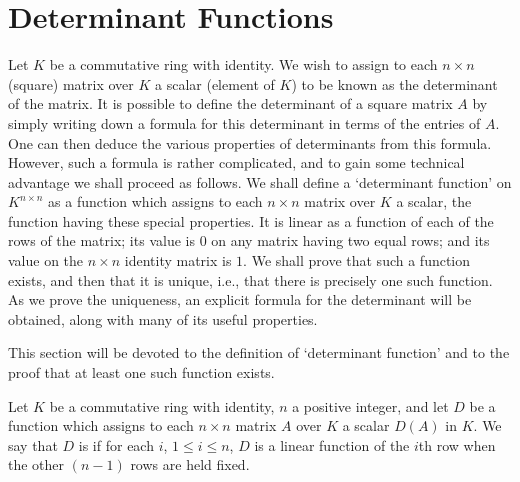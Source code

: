 \section{Determinant Functions}

Let \(K\) be a commutative ring with identity. We wish to assign to each \(n\times n\) (square) matrix over \(K\) a scalar (element of \(K\)) to be known as the determinant of the matrix. It is possible to define the determinant of a square matrix \(A\) by simply writing down a formula for this determinant in terms of the entries of \(A\). One can then deduce the various properties of determinants from this formula. However, such a formula is rather complicated, and to gain some technical advantage we shall proceed as follows. We shall define a `determinant function' on \(K^{n\times n}\) as a function which assigns to each \(n\times n\) matrix over \(K\) a scalar, the function having these special properties. It is linear as a function of each of the rows of the matrix; its value is \(0\) on any matrix having two equal rows; and its value on the \(n\times n\) identity matrix is \(1\). We shall prove that such a function exists, and then that it is unique, i.e., that there is precisely one such function. As we prove the uniqueness, an explicit formula for the determinant will be obtained, along with many of its useful properties.

This section will be devoted to the definition of `determinant function' and to the proof that at least one such function exists.

\begin{definition}
    Let \(K\) be a commutative ring with identity, \(n\) a positive integer, and let \(D\) be a function which assigns to each \(n\times n\) matrix \(A\) over \(K\) a scalar \(D\left(A\right)\) in \(K\). We say that \(D\) is  if for each \(i\), \(1\leqslant i\leqslant n\), \(D\) is a linear function of the \(i\)th row when the other \(\left(n-1\right)\) rows are held fixed.
\end{definition}

